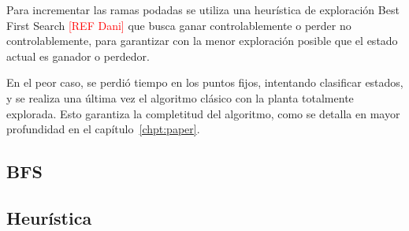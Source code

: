 Para incrementar las ramas podadas se utiliza una heurística de exploración Best First Search \textcolor{red}{[REF Dani]} que busca ganar controlablemente o perder no controlablemente, para garantizar con la menor exploración posible que el estado actual es ganador o perdedor.

En el peor caso, se perdió tiempo en los puntos fijos, intentando clasificar estados, y se realiza una última vez el algoritmo clásico con la planta totalmente explorada. Esto garantiza la completitud del algoritmo, como se detalla en mayor profundidad en el capítulo~\ref{chpt:paper}.

\subsection{BFS}

\subsection{Heurística}















